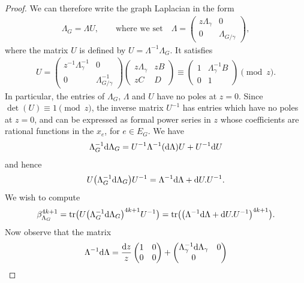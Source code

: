 \documentclass[pdftex]{sigma}%
\numberwithin{equation}{section}
\newcommand{\tr}{\mathrm{tr}}
\newcommand{\0}{\color{blue}{\mathsf{0}}}
\begin{document}
\begin{proof}
We can therefore write the graph Laplacian in the form
\begin{gather*}
 \Lambda_G = \Lambda U, \qquad \text{where we set} \quad \Lambda = \begin{pmatrix} z \Lambda_{\gamma} & 0 \\ 0 & \Lambda_{G/\gamma} \end{pmatrix}\!,
 \end{gather*}
where the matrix $U$ is defined by $U= \Lambda^{-1}\Lambda_G$. It satisfies
\begin{gather*}
U= \begin{pmatrix} z^{-1} \Lambda^{-1}_{\gamma} & 0 \\ 0 & \Lambda^{-1}_{G/\gamma} \end{pmatrix} \begin{pmatrix} z \Lambda_{\gamma} & zB \\ zC & D \end{pmatrix} \equiv \begin{pmatrix} 1 & \Lambda_{\gamma}^{-1}B \\ 0 & 1 \end{pmatrix} \pmod{z} .
\end{gather*}
In particular, the entries of $\Lambda_G$, $\Lambda$ and $U$ have no poles at $z=0$. Since $\det(U) \equiv 1 \pmod{z}$, the inverse matrix $U^{-1}$ has entries which have no poles at $z=0$, and can be expressed as formal power series in $z$ whose coefficients are rational functions in the $x_e$, for $e \in E_G$. We have
\begin{gather*}
 \Lambda_G^{-1} {\rm d} \Lambda_G = U^{-1} \Lambda^{-1} ({\rm d} \Lambda) U + U^{-1} {\rm d}U
 \end{gather*}
and hence
\begin{gather*}
U \big(\Lambda_G^{-1} {\rm d}\Lambda_G\big) U^{-1} =\Lambda^{-1} {\rm d}\Lambda + {\rm d}U.U^{-1}.
\end{gather*}
We wish to compute
\begin{gather*}
 \beta_{\Lambda_G}^{4k+1} = \tr\big( U\big(\Lambda_G^{-1} {\rm d}\Lambda_G\big)^{4k+1}U^{-1} \big) = \tr\big(\big(\Lambda^{-1} {\rm d}\Lambda + {\rm d} U .U^{-1}\big)^{4k+1} \big) .
 \end{gather*}
Now observe that the matrix
\begin{gather*}
 \Lambda^{-1}{\rm d}\Lambda = \frac{{\rm d}z}{z} \begin{pmatrix} 1 & 0 \\ 0 & 0 \end{pmatrix} + \begin{pmatrix} \Lambda_{\gamma}^{-1} {\rm d} \Lambda_{\gamma} & 0 \\ 0 &

\end{pmatrix}
\end{gather*}
\end{proof}
\end{document}
